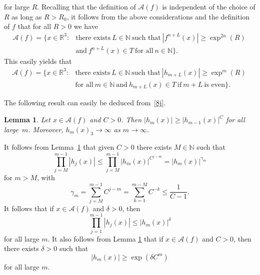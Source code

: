 \documentclass[12pt,a4paper]{amsart}
\theoremstyle{plain}
\newtheorem{lemma}[theorem]{Lemma}
\theoremstyle{definition}
\theoremstyle{remark}
\def\R{\mathbb R}
\def\N{\mathbb N}
\def\cA{\mathcal A}
\numberwithin{equation}{section}
\begin{document}
for large  $R$.
Recalling that the definition of $\cA(f)$ is independent of the choice of 
$R$ as long as $R> R_0$,  it follows from the above considerations and the 
definition of $f$ that for all $R>0$ we have 
\begin{equation}\label{8i}
\begin{aligned}
\cA(f) = \{ x \in \R^3 \colon  
& \text{there exists}\ L \in \N \ \text{such that}\ 
|f^{n+L}(x)| \geq \exp^{2n}(R) \ 
\\ &
\text{and}\ f^{n+L}(x)\in T\ \text{for all}\  n\in \mathbb{N}\} .
\end{aligned}
\end{equation}
This easily yields that 
\begin{equation}\label{8j}
\begin{aligned}
\cA(f) = \{ x \in \R^3 \colon  
& \text{there exists}\ L \in \N \ \text{such that}\ 
|h_{m+L}(x)| \geq \exp^{m}(R) \ 
\\ &
\text{for all}\  m\in \mathbb{N}
\ \text{and}\ h_{m+L}(x)\in T\ \text{if}\ m+L \ \text{is even}\} .
\end{aligned}
\end{equation}

The following result can easily be deduced from~\eqref{8j}.
\begin{lemma} \label{lemma13}
Let $x\in\cA(f)$ and $C>0$.
Then $|h_m(x)|\geq |h_{m-1}(x)|^C$ for all large~$m$.
Moreover, $h_m(x)_3\to\infty$ as $m\to\infty$.
\end{lemma} 
It follows from Lemma~\ref{lemma13} that given $C>0$ there exists $M\in\N$
such that 
\begin{equation}\label{8k}
\prod_{j=M}^{m-1} |h_{j}(x)| \leq 
\prod_{j=M}^{m-1} |h_{m}(x)|^{C^{j-m}} =|h_{m}(x)|^{\gamma_m}
\end{equation}
for $m> M$, with
\begin{equation}\label{8l}
\gamma_m=\sum_{j=M}^{m-1}C^{j-m} = \sum_{k=1}^{m-M}C^{-k} \leq \frac{1}{C-1}.
\end{equation}
It follows that if $x\in \cA(f)$ and  $\delta>0$, then
\begin{equation}\label{8m}
\prod_{j=1}^{m-1} |h_{j}(x)| \leq |h_{m}(x)|^\delta 
\end{equation}
for all large $m$. It also follows from Lemma \ref{lemma13} that if $x\in\cA(f)$ and $C>0$,
then there exists $\delta>0$ such that 
\begin{equation}\label{eq8m}
|h_m(x)|\geq \exp( \delta C^m)
\end{equation}
for all large $m$.
\end{document}
